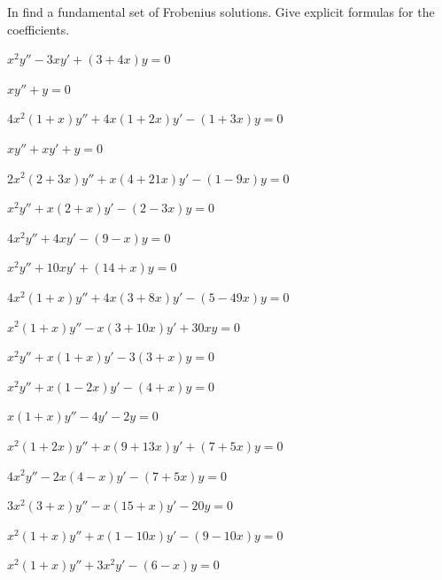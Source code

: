 \exercises
In  find
a fundamental set  of Frobenius solutions. Give explicit formulas for
the coefficients.

\begin{exerciselist}
\item\label{exer:7.7.1}$x^2y''-3xy'+(3+4x)y=0$


\item\label{exer:7.7.2}$xy''+y=0$

\item\label{exer:7.7.3}$4x^2(1+x)y''+4x(1+2x)y'-(1+3x)y=0$


\item\label{exer:7.7.4}$xy''+xy'+y=0$

\item\label{exer:7.7.5}$2x^2(2+3x)y''+x(4+21x)y'-(1-9x)y=0$

\item\label{exer:7.7.6}$x^2y''+x(2+x)y'-(2-3x)y=0$

\item\label{exer:7.7.7}$4x^2y''+4xy'-(9-x)y=0$

\item\label{exer:7.7.8}$x^2y''+10xy'+(14+x)y=0$

\item\label{exer:7.7.9}$4x^2(1+x)y''+4x(3+8x)y'-(5-49x)y=0$

\item\label{exer:7.7.10}$x^2(1+x)y''-x(3+10x)y'+30xy=0$

\item\label{exer:7.7.11}$x^2y''+x(1+x)y'-3(3+x)y=0$

\item\label{exer:7.7.12}$x^2y''+x(1-2x)y'-(4+x)y=0$


\item\label{exer:7.7.13}$x(1+x)y''-4y'-2y=0$

\item\label{exer:7.7.14}$x^2(1+2x)y''+x(9+13x)y'+(7+5x)y=0$

\item\label{exer:7.7.15}$4x^2y''-2x(4-x)y'-(7+5x)y=0$

\item\label{exer:7.7.16}$3x^2(3+x)y''-x(15+x)y'-20y=0$

\item\label{exer:7.7.17}$x^2(1+x)y''+x(1-10x)y'-(9-10x)y=0$

\item\label{exer:7.7.18}$x^2(1+x)y''+3x^2y'-(6-x)y=0$


\end{exerciselist}
